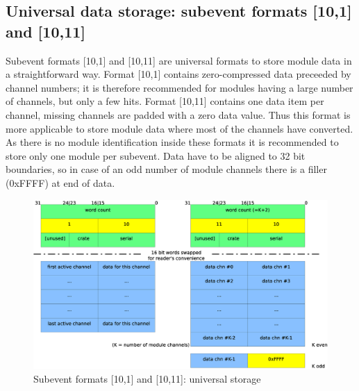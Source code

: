 \documentclass[10pt,a4paper]{article}
\begin{document}
\subsection{Universal data storage: subevent formats [10,1] and [10,11]}
Subevent formats [10,1] and [10,11] are universal formats to store module data in a straightforward way.
Format [10,1] contains zero-compressed data preceeded by channel numbers; it is therefore recommended for
modules having a large number of channels, but only a few hits. Format [10,11] contains one data item per channel,
missing channels are padded with a zero data value. Thus this format is more applicable to store module data
where most of the channels have converted. As there is no module identification inside these formats
it is recommended to store only one module per subevent. Data have to be aligned to 32 bit boundaries, so in case of
an odd number of module channels there is a filler (0xFFFF) at end of data.
\begin{figure}[H]
\centerline{\includegraphics[width=\linewidth]{MedSevt_10_1_11}}
\caption{Subevent formats [10,1] and [10,11]: universal storage}
\label{MedSevt_10_1_11}
\end{figure}
\newpage
\end{document}
